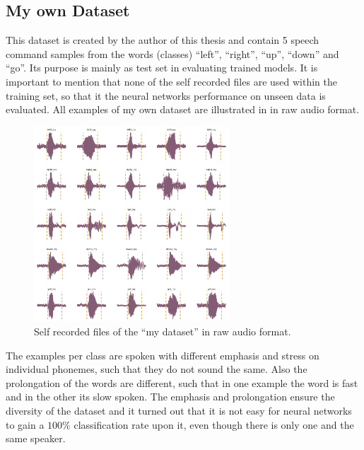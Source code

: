
\subsection{My own Dataset}\label{sec:exp_dataset_my}
This dataset is created by the author of this thesis and contain 5 speech command samples from the words (classes) \enquote{left}, \enquote{right}, \enquote{up}, \enquote{down} and \enquote{go}.
Its purpose is mainly as test set in evaluating trained models.
It is important to mention that none of the self recorded files are used within the training set, so that it the neural networks performance on unseen data is evaluated.
All examples of my own dataset are illustrated in  in raw audio format.
\begin{figure}[!ht]
  \centering
    \includegraphics[width=0.65\textwidth]{./5_exp/figs/exp_dataset_wav_grid_my}
  \caption{Self recorded files of the \enquote{my dataset} in raw audio format.}
  \label{fig:exp_dataset_wav_grid_my}
\end{figure}
\FloatBarrier
\noindent
The examples per class are spoken with different emphasis and stress on individual phonemes, such that they do not sound the same.
Also the prolongation of the words are different, such that in one example the word is fast and in the other its slow spoken.
The emphasis and prolongation ensure the diversity of the dataset and it turned out that it is not easy for neural networks to gain a $100\%$ classification rate upon it, even though there is only one and the same speaker.
